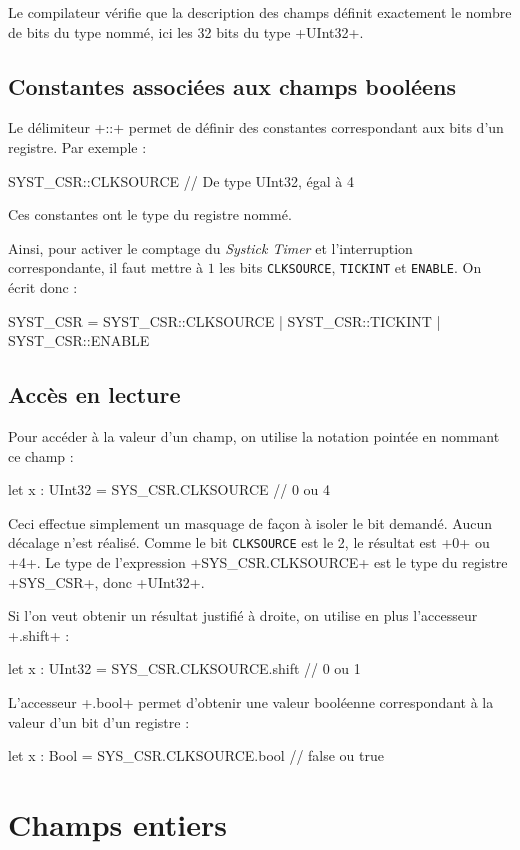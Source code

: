 Le compilateur vérifie que la description des champs définit exactement le nombre de bits du type nommé, ici les 32 bits du type \plm+UInt32+.


\subsection{Constantes associées aux champs booléens}

Le délimiteur \plm+::+ permet de définir des constantes correspondant aux bits d'un registre. Par exemple :
\begin{PLM}
SYST_CSR::CLKSOURCE // De type UInt32, égal à 4
\end{PLM}
Ces constantes ont le type du registre nommé.

Ainsi, pour activer le comptage du \emph{Systick Timer} et l'interruption correspondante, il faut mettre à $1$ les bits \texttt{CLKSOURCE}, \texttt{TICKINT} et \texttt{ENABLE}. On écrit donc :
\begin{PLM}
SYST_CSR = SYST_CSR::CLKSOURCE | SYST_CSR::TICKINT | SYST_CSR::ENABLE
\end{PLM}


\subsection{Accès en lecture}
Pour accéder à la valeur d'un champ, on utilise la notation pointée en nommant ce champ :
\begin{PLM}
let x : UInt32 = SYS_CSR.CLKSOURCE // 0 ou 4
\end{PLM}
Ceci effectue simplement un masquage de façon à isoler le bit demandé. Aucun décalage n'est réalisé. Comme le bit \texttt{CLKSOURCE} est le 2, le résultat est \plm+0+ ou \plm+4+. Le type de l'expression \plm+SYS_CSR.CLKSOURCE+ est le type du registre \plm+SYS_CSR+, donc \plm+UInt32+.

Si l'on veut obtenir un résultat justifié à droite, on utilise en plus l'accesseur \plm+.shift+ :
\begin{PLM}
let x : UInt32 = SYS_CSR.CLKSOURCE.shift // 0 ou 1
\end{PLM}

L'accesseur  \plm+.bool+ permet d'obtenir une valeur booléenne correspondant à la valeur d'un bit d'un registre :
\begin{PLM}
let x : Bool = SYS_CSR.CLKSOURCE.bool // false ou true
\end{PLM}




\section {Champs entiers}

